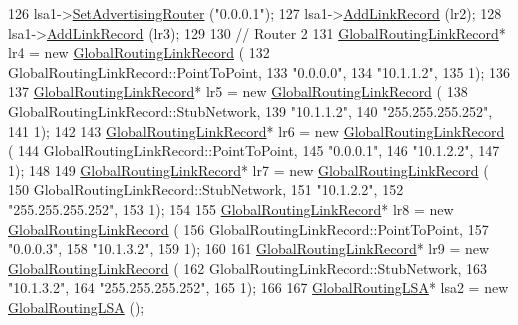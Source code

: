 \begin{DoxyCode}
126   lsa1->\hyperlink{classns3_1_1GlobalRoutingLSA_a97f6a00183d783cef4afb54c2216fa2f}{SetAdvertisingRouter} (\textcolor{stringliteral}{"0.0.0.1"});
127   lsa1->\hyperlink{classns3_1_1GlobalRoutingLSA_a2b2bdf9b121a61fe793c88ab216f4fb9}{AddLinkRecord} (lr2);
128   lsa1->\hyperlink{classns3_1_1GlobalRoutingLSA_a2b2bdf9b121a61fe793c88ab216f4fb9}{AddLinkRecord} (lr3);
129 
130   \textcolor{comment}{// Router 2 }
131   \hyperlink{classns3_1_1GlobalRoutingLinkRecord}{GlobalRoutingLinkRecord}* lr4 = \textcolor{keyword}{new} 
      \hyperlink{classns3_1_1GlobalRoutingLinkRecord}{GlobalRoutingLinkRecord} (
132       GlobalRoutingLinkRecord::PointToPoint,
133       \textcolor{stringliteral}{"0.0.0.0"},
134       \textcolor{stringliteral}{"10.1.1.2"},
135       1);
136 
137   \hyperlink{classns3_1_1GlobalRoutingLinkRecord}{GlobalRoutingLinkRecord}* lr5 = \textcolor{keyword}{new} 
      \hyperlink{classns3_1_1GlobalRoutingLinkRecord}{GlobalRoutingLinkRecord} (
138       GlobalRoutingLinkRecord::StubNetwork,
139       \textcolor{stringliteral}{"10.1.1.2"},
140       \textcolor{stringliteral}{"255.255.255.252"},
141       1);
142 
143   \hyperlink{classns3_1_1GlobalRoutingLinkRecord}{GlobalRoutingLinkRecord}* lr6 = \textcolor{keyword}{new} 
      \hyperlink{classns3_1_1GlobalRoutingLinkRecord}{GlobalRoutingLinkRecord} (
144       GlobalRoutingLinkRecord::PointToPoint,
145       \textcolor{stringliteral}{"0.0.0.1"},
146       \textcolor{stringliteral}{"10.1.2.2"},
147       1);
148 
149   \hyperlink{classns3_1_1GlobalRoutingLinkRecord}{GlobalRoutingLinkRecord}* lr7 = \textcolor{keyword}{new} 
      \hyperlink{classns3_1_1GlobalRoutingLinkRecord}{GlobalRoutingLinkRecord} (
150       GlobalRoutingLinkRecord::StubNetwork,
151       \textcolor{stringliteral}{"10.1.2.2"},
152       \textcolor{stringliteral}{"255.255.255.252"},
153       1);
154 
155   \hyperlink{classns3_1_1GlobalRoutingLinkRecord}{GlobalRoutingLinkRecord}* lr8 = \textcolor{keyword}{new} 
      \hyperlink{classns3_1_1GlobalRoutingLinkRecord}{GlobalRoutingLinkRecord} (
156       GlobalRoutingLinkRecord::PointToPoint,
157       \textcolor{stringliteral}{"0.0.0.3"},
158       \textcolor{stringliteral}{"10.1.3.2"},
159       1);
160 
161   \hyperlink{classns3_1_1GlobalRoutingLinkRecord}{GlobalRoutingLinkRecord}* lr9 = \textcolor{keyword}{new} 
      \hyperlink{classns3_1_1GlobalRoutingLinkRecord}{GlobalRoutingLinkRecord} (
162       GlobalRoutingLinkRecord::StubNetwork,
163       \textcolor{stringliteral}{"10.1.3.2"},
164       \textcolor{stringliteral}{"255.255.255.252"},
165       1);
166 
167   \hyperlink{classns3_1_1GlobalRoutingLSA}{GlobalRoutingLSA}* lsa2 = \textcolor{keyword}{new} \hyperlink{classns3_1_1GlobalRoutingLSA}{GlobalRoutingLSA} ();

\end{DoxyCode}
